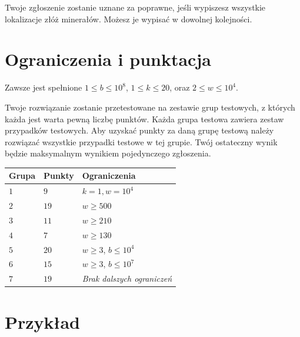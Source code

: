 Twoje zgłoszenie zostanie uznane za poprawne, jeśli wypiszesz wszystkie lokalizacje złóż minerałów.
Możesz je wypisać w dowolnej kolejności.

\section*{Ograniczenia i punktacja}

Zawsze jest spełnione 
$1\leq b \leq 10^8$, %
$1 \leq k \leq 20$, %
oraz
$2 \le w \le 10^4$. %

Twoje rozwiązanie zostanie przetestowane na zestawie grup testowych, z których każda jest warta pewną liczbę punktów.
Każda grupa testowa zawiera zestaw przypadków testowych.
Aby uzyskać punkty za daną grupę testową należy rozwiązać wszystkie przypadki testowe w tej grupie.
Twój ostateczny wynik będzie maksymalnym wynikiem pojedynczego zgłoszenia.

\medskip
\begin{tabular}{lll}
Grupa & Punkty & Ograniczenia \\\hline
  $1$ & $9$ & $k = 1, w = 10^4$\\
  $2$ & $19$ & $w \ge 500$\\
  $3$ & $11$ & $w \ge 210$\\
  $4$ & $7$ & $w \ge 130$\\
  $5$ & $20$ & $w \ge 3$, $b \le 10^4$\\
  $6$ & $15$ & $w \ge 3$, $b \le 10^7$\\
  $7$ & $19$ & \emph{Brak dalszych ograniczeń}
\end{tabular}

\section*{Przykład}

